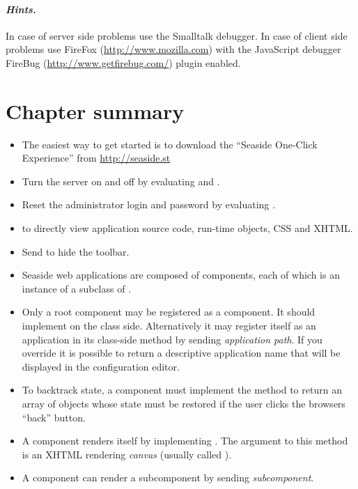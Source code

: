 \documentclass[a4paper,10pt,twoside]{book}
\begin{document}
\paragraph{\emph{Hints.}}
In case of server side problems use the Smalltalk debugger.
In case of client side problems use FireFox (\url{http://www.mozilla.com}) with the JavaScript debugger FireBug (\url{http://www.getfirebug.com/}) plugin enabled.

\section{Chapter summary}

\begin{itemize}
  \item The easiest way to get started is to download the ``Seaside One-Click Experience'' from \url{http://seaside.st}
  \item Turn the server on and off by evaluating  and .
  \item Reset the administrator login and password by evaluating .
  \item {} to directly view application source code, run-time objects, CSS and XHTML.
  \item Send  to hide the toolbar.
  \item Seaside web applications are composed of components, each of which is an instance of a subclass of .
  \item Only a root component may be registered as a component. It should implement  on the class side. Alternatively it may register itself as an application in its class-side  method by sending  \emph{application path}.
  If you override  it is possible to return a descriptive application name that will be displayed in the configuration editor.
  \item To backtrack state, a component must implement the  method to return an array of objects whose state must be restored if the user clicks the browsers ``back'' button.
  \item A component renders itself by implementing .
  The argument to this method is an XHTML rendering \emph{canvas} (usually called ).
  \item A component can render a subcomponent by sending  \emph{subcomponent}.

\end{itemize}
\end{document}
